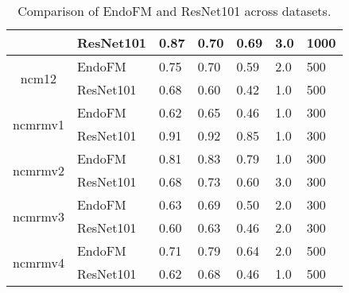 \begin{table}[h]
\begin{tabular}{cllllll}
     & ResNet101 & 0.87 & 0.70 & 0.69 & 3.0 & 1000 \\
    \midrule
    \multirow{2}{*}{ncm12}
 & EndoFM & 0.75 & 0.70 & 0.59 & 2.0 & 500 \\
     & ResNet101 & 0.68 & 0.60 & 0.42 & 1.0 & 500 \\
    \midrule
    \multirow{2}{*}{ncmrmv1}
 & EndoFM & 0.62 & 0.65 & 0.46 & 1.0 & 300 \\
     & ResNet101 & 0.91 & 0.92 & 0.85 & 1.0 & 300 \\
    \midrule
    \multirow{2}{*}{ncmrmv2}
 & EndoFM & 0.81 & 0.83 & 0.79 & 1.0 & 300 \\
     & ResNet101 & 0.68 & 0.73 & 0.60 & 3.0 & 300 \\
    \midrule
    \multirow{2}{*}{ncmrmv3}
 & EndoFM & 0.63 & 0.69 & 0.50 & 2.0 & 300 \\
     & ResNet101 & 0.60 & 0.63 & 0.46 & 2.0 & 300 \\
    \midrule
    \multirow{2}{*}{ncmrmv4}
 & EndoFM & 0.71 & 0.79 & 0.64 & 2.0 & 500 \\
     & ResNet101 & 0.62 & 0.68 & 0.46 & 1.0 & 500 \\
    \midrule
    \bottomrule
    \end{tabular}
    \vspace{-0.1in}
    \caption{Comparison of EndoFM and ResNet101 across datasets.}
    \label{tab:performance_comparison}
\end{table}
